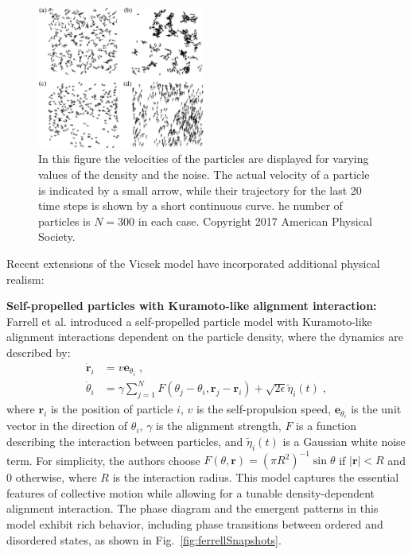 \documentclass[a4paper, amsfonts, amssymb, amsmath, reprint, showkeys, showpacs, nofootinbib, twoside]{revtex4-2}
\begin{document}
\begin{figure}
    \includegraphics[width=0.49\textwidth]{./figs/vicsekSnapshots.png}
    \caption{
        \label{fig:vicsekSnapshots}
        In this figure the velocities of the particles are displayed for varying values of the density and the noise.
        The actual velocity of a particle is indicated by a small arrow, while their trajectory for the last 20 time steps is shown by a short continuous curve. he number of particles is $N = 300$ in each case. Copyright 2017 American Physical Society.
    }
\end{figure}

Recent extensions of the Vicsek model have incorporated additional physical realism:

\textbf{Self-propelled particles with Kuramoto-like alignment interaction:} Farrell et al. \cite{PhysRevLett.108.248101} introduced a self-propelled particle model with Kuramoto-like alignment interactions dependent on the particle density, where the dynamics are described by:
\begin{subequations}
    \begin{align}
        \dot{\mathbf{r}}_i&=v\mathbf{e}_{\theta _i}\;,
        \\
        \dot{\theta}_i&=\gamma \sum_{j=1}^N{F\left( \theta _j-\theta _i,\mathbf{r}_j-\mathbf{r}_i \right) +\sqrt{2\epsilon}\tilde{\eta}_i\left( t \right)}\;,
    \end{align}
\end{subequations}
where $\mathbf{r}_i$ is the position of particle $i$, $v$ is the self-propulsion speed, $\mathbf{e}_{\theta _i}$ is the unit vector in the direction of $\theta _i$, $\gamma$ is the alignment strength, $F$ is a function describing the interaction between particles, and $\tilde{\eta}_i\left( t \right)$ is a Gaussian white noise term. For simplicity, the authors choose $F\left( \theta ,\mathbf{r} \right) =\left( \pi R^2 \right) ^{-1}\sin \theta $ if $\left|\mathbf{r}\right|<R$ and 0 otherwise, where $R$ is the interaction radius. This model captures the essential features of collective motion while allowing for a tunable density-dependent alignment interaction. The phase diagram and the emergent patterns in this model exhibit rich behavior, including phase transitions between ordered and disordered states, as shown in Fig.~\ref{fig:ferrellSnapshots}.
\end{document}
